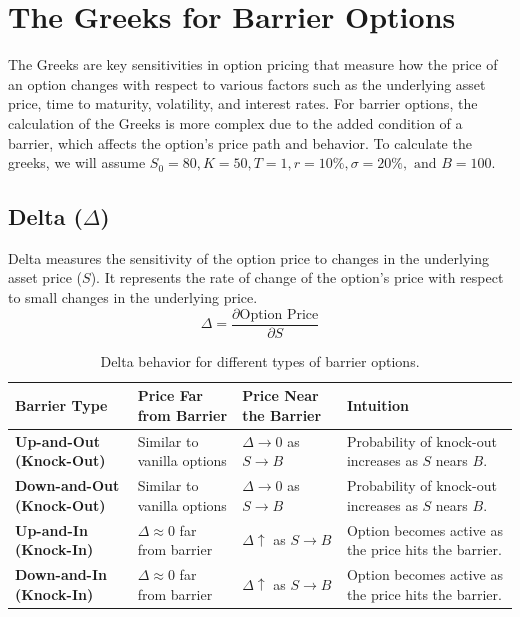 \chapter{The Greeks for Barrier Options}
\label{sec:greeks}

The Greeks are key sensitivities in option pricing that measure how the price of an option changes with respect to various factors such as the underlying asset price, time to maturity, volatility, and interest rates. For barrier options, the calculation of the Greeks is more complex due to the added condition of a barrier, which affects the option's price path and behavior. To calculate the greeks, we will assume $S_0=80, K=50, T=1, r=10\%, \sigma=20\%, \text{ and } B=100.$

\section{Delta (\(\Delta\))}

Delta measures the sensitivity of the option price to changes in the underlying asset price (\(S\)). It represents the rate of change of the option's price with respect to small changes in the underlying price.
\begin{equation}
	\Delta = \frac{\partial \text{Option Price}}{\partial S}
\end{equation}
\begin{center}
	\begin{table}
		\begin{tabular}{ | m{3cm} | m{4.5cm}| m{4.5cm} | m{4cm}|} 
			\hline
			\textbf{Barrier Type} & \textbf{Price Far from Barrier} & \textbf{Price Near the Barrier} & \textbf{Intuition}  \\
			\hline
			\textbf{Up-and-Out (Knock-Out)} & Similar to vanilla options     & $\Delta \to 0$ as $S \to B$  & Probability of knock-out increases as $S$ nears $B$. \\ 
			\hline
			\textbf{Down-and-Out (Knock-Out)} & Similar to vanilla options     & $\Delta \to 0$ as $S \to B$  & Probability of knock-out increases as $S$ nears $B$. \\ 
			\hline
			\textbf{Up-and-In (Knock-In)}    & $\Delta \approx 0$ far from barrier   & $\Delta \uparrow$ as $S \to B$  & Option becomes active as the price hits the barrier. \\ 
			\hline
			\textbf{Down-and-In (Knock-In)}  & $\Delta \approx 0$ far from barrier   & $\Delta \uparrow$ as $S \to B$  & Option becomes active as the price hits the barrier. \\ 
			\hline
		\end{tabular}
		\caption{Delta behavior for different types of barrier options.}
		\label{tab:delta_barrier_options}
	\end{table}
\end{center}

